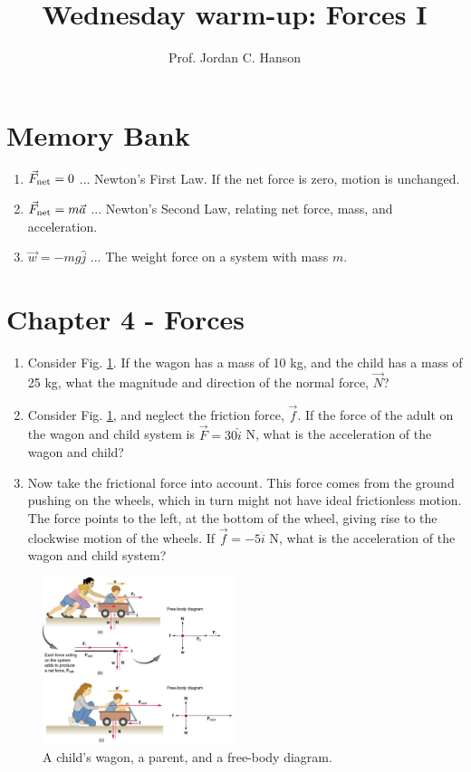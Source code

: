 \documentclass{article}
\begin{document}
\twocolumn

\title{Wednesday warm-up: Forces I}
\author{Prof. Jordan C. Hanson}

\maketitle

\section{Memory Bank}

\begin{enumerate}
\item $\vec{F}_{\rm net} = 0$ ... Newton's First Law.  If the net force is zero, motion is unchanged.
\item $\vec{F}_{\rm net} = m \vec{a}$ ... Newton's Second Law, relating net force, mass, and acceleration.
\item $\vec{w} = -m g \hat{j}$ ... The weight force on a system with mass $m$.
\end{enumerate}

\section{Chapter 4 - Forces}

\begin{enumerate}
\item Consider Fig. \ref{fig:1}.  If the wagon has a mass of 10 kg, and the child has a mass of 25 kg, what the magnitude and direction of the normal force, $\vec{N}$? \\ \vspace{3cm}
\item Consider Fig. \ref{fig:1}, and neglect the friction force, $\vec{f}$.  If the force of the adult on the wagon and child system is $\vec{F} = 30 \hat{i}$ N, what is the acceleration of the wagon and child? \\ \vspace{3cm}
\item Now take the frictional force into account.  This force comes from the ground pushing on the wheels, which in turn might not have ideal frictionless motion.  The force points to the left, at the bottom of the wheel, giving rise to the clockwise motion of the wheels.  If $\vec{f} = - 5 \hat{i}$ N, what is the acceleration of the wagon and child system? \\ \vspace{3cm}
\end{enumerate}

\begin{figure}
\centering
\includegraphics[width=0.5\textwidth,trim=0cm 0cm 0cm 9cm,clip=true]{figures/wagon.jpeg}
\caption{\label{fig:1} A child's wagon, a parent, and a free-body diagram.}
\end{figure}
\end{document}

